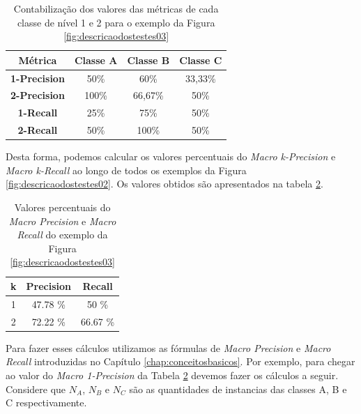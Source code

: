 \begin{table}[h!]
  \begin{center}
    \begin{tabular}{cccc}
      \hline
       Métrica  & \textbf{Classe A} & \textbf{Classe B} & \textbf{Classe C} \\
      \hline

      \textbf{1-Precision} & 50\% & 60\% & 33,33\% \\
      \textbf{2-Precision} & 100\% & 66,67\% & 50\% \\
      \textbf{1-Recall} & 25\% & 75\% & 50\% \\
      \textbf{2-Recall} & 50\% & 100\% & 50\% \\
      
      \hline
    \end{tabular}
    \caption{Contabilização dos valores das métricas de cada classe de nível 1 e 2 para o exemplo da Figura \ref{fig:descricaodostestes03}}
    \label{tab:valores_classes}
  \end{center}
\end{table}

Desta forma, podemos calcular os valores percentuais do \textit{Macro k-Precision} e \textit{Macro k-Recall} ao longo de todos os exemplos da Figura \ref{fig:descricaodostestes02}.
Os valores obtidos são apresentados na tabela \ref{tab:valores_macro}.

\begin{table}[h!]
  \begin{center}
    \begin{tabular}{ccc}
      \hline
      \textbf{k} & \textbf{Precision} & \textbf{Recall} \\
      \hline

1	&	47.78 \%	&	50 \%	\\
2	&	72.22 \%	&	66.67 \%	\\

      \hline
    \end{tabular}
    \caption{Valores percentuais do \textit{Macro Precision} e \textit{Macro Recall} do exemplo da Figura \ref{fig:descricaodostestes03}}
    \label{tab:valores_macro}
  \end{center}
\end{table}

Para fazer esses cálculos utilizamos as fórmulas de \textit{Macro Precision} e \textit{Macro Recall} introduzidas no Capítulo \ref{chap:conceitosbasicos}.
Por exemplo, para chegar ao valor do \textit{Macro 1-Precision} da Tabela \ref{tab:valores_macro} devemos fazer os cálculos a seguir.
Considere que $N_A$, $N_B$ e $N_C$ são as quantidades de instancias das classes A, B e C respectivamente.

